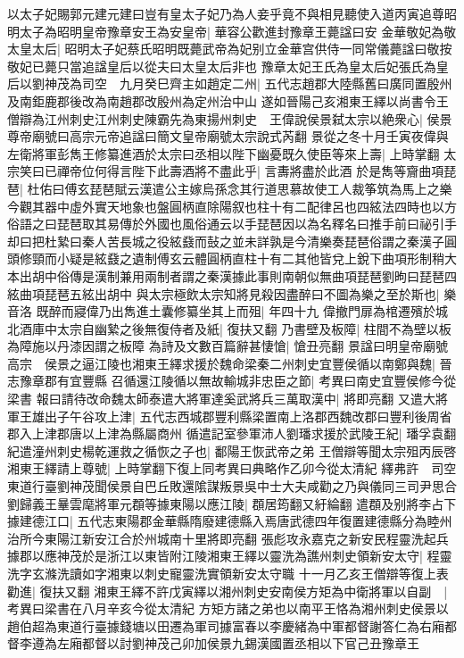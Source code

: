 以太子妃賜郭元建元建曰豈有皇太子妃乃為人妾乎竟不與相見聽使入道丙寅追尊昭明太子為昭明皇帝豫章安王為安皇帝|{
	華容公歡進封豫章王薨諡曰安}
金華敬妃為敬太皇太后|{
	昭明太子妃蔡氏昭明既薨武帝為妃别立金華宫供侍一同常儀薨諡曰敬按敬妃已薨只當追諡皇后以從夫曰太皇太后非也}
豫章太妃王氏為皇太后妃張氏為皇后以劉神茂為司空　九月癸巳齊主如趙定二州|{
	五代志趙郡大陸縣舊曰廣同置殷州及南鉅鹿郡後改為南趙郡改殷州為定州治中山}
遂如晉陽己亥湘東王繹以尚書令王僧辯為江州刺史江州刺史陳霸先為東揚州刺史　王偉說侯景弑太宗以絶衆心|{
	侯景尊帝廟號曰高宗元帝追諡曰簡文皇帝廟號太宗說式芮翻}
景從之冬十月壬寅夜偉與左衛將軍彭雋王修纂進酒於太宗曰丞相以陛下幽憂既久使臣等來上壽|{
	上時掌翻}
太宗笑曰已禪帝位何得言陛下此壽酒將不盡此乎|{
	言夀將盡於此酒}
於是雋等齎曲項琵琶|{
	杜佑曰傅玄琵琶賦云漢遣公主嫁烏孫念其行道思慕故使工人裁筝筑為馬上之樂今觀其器中虛外實天地象也盤圓柄直除陽叙也柱十有二配律呂也四絃法四時也以方俗語之曰琵琶取其易傳於外國也風俗通云以手琵琶因以為名釋名曰推手前曰祕引手却曰把杜縶曰秦人苦長城之役絃鼗而鼔之並未詳孰是今清樂奏琵琶俗謂之秦漢子圓頭修頸而小疑是絃鼗之遺制傅玄云體圓柄直柱十有二其他皆兌上銳下曲項形制稍大本出胡中俗傳是漢制兼用兩制者謂之秦漢據此事則南朝似無曲項琵琶劉昫曰琵琶四絃曲項琵琶五絃出胡中}
與太宗極飲太宗知將見殺因盡醉曰不圖為樂之至於斯也|{
	樂音洛}
既醉而寢偉乃出雋進土囊修纂坐其上而殂|{
	年四十九}
偉撤門扉為棺遷殯於城北酒庫中太宗自幽縶之後無復侍者及紙|{
	復扶又翻}
乃書壁及板障|{
	柱間不為壁以板為障施以丹漆因謂之板障}
為詩及文數百篇辭甚悽愴|{
	愴丑亮翻}
景諡曰明皇帝廟號高宗　侯景之逼江陵也湘東王繹求援於魏命梁秦二州刺史宜豐侯循以南鄭與魏|{
	晉志豫章郡有宜豐縣}
召循還江陵循以無故輸城非忠臣之節|{
	考異曰南史宜豐侯修今從梁書}
報曰請待改命魏太師泰遣大將軍達奚武將兵三萬取漢中|{
	將即亮翻}
又遣大將軍王雄出子午谷攻上津|{
	五代志西城郡豐利縣梁置南上洛郡西魏改郡曰豐利後周省郡入上津郡唐以上津為縣屬商州}
循遣記室參軍沛人劉璠求援於武陵王紀|{
	璠孚袁翻}
紀遣潼州刺史楊乾運救之循恢之子也|{
	鄱陽王恢武帝之弟}
王僧辯等聞太宗殂丙辰啓湘東王繹請上尊號|{
	上時掌翻下復上同考異曰典略作乙卯今從太清紀}
繹弗許　司空東道行臺劉神茂聞侯景自巴丘敗還隂謀叛景吳中士大夫咸勸之乃與儀同三司尹思合劉歸義王曅雲麾將軍元頵等據東陽以應江陵|{
	頵居筠翻又紆綸翻}
遣頵及别將李占下據建德江口|{
	五代志東陽郡金華縣隋廢建德縣入焉唐武德四年復置建德縣分為睦州治所今東陽江新安江合於州城南十里將即亮翻}
張彪攻永嘉克之新安民程靈洗起兵據郡以應神茂於是浙江以東皆附江陵湘東王繹以靈洗為譙州刺史領新安太守|{
	程靈洗字玄滌洗讀如字湘東以刺史寵靈洗實領新安太守職}
十一月乙亥王僧辯等復上表勸進|{
	復扶又翻}
湘東王繹不許戊寅繹以湘州刺史安南侯方矩為中衛將軍以自副　|{
	考異曰梁書在八月辛亥今從太清紀}
方矩方諸之弟也以南平王恪為湘州刺史侯景以趙伯超為東道行臺據錢塘以田遷為軍司據富春以李慶緒為中軍都督謝答仁為右廂都督李遵為左廂都督以討劉神茂己卯加侯景九錫漢國置丞相以下官己丑豫章王


